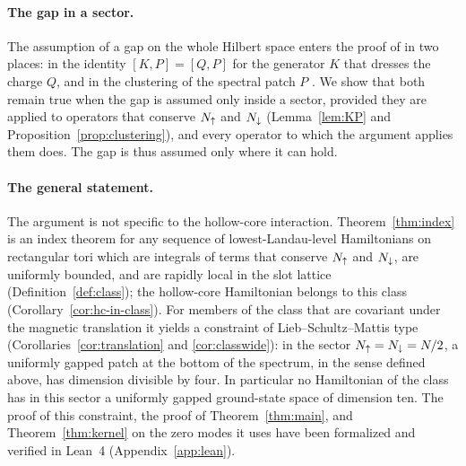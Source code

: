 \paragraph{The gap in a sector.}
The assumption of a gap on the whole Hilbert space enters the proof of \cite{BBDF21} in two places: in the
identity $[K,P]=[Q,P]$ for the generator $K$ that dresses the charge $Q$, and in the clustering of the
spectral patch $P$ \cite[Proposition~3.1]{BBDF21}. We show that both remain true when the gap is assumed
only inside a sector, provided they are applied to operators that conserve $N_{\uparrow}$ and $N_{\downarrow}$
(Lemma~\ref{lem:KP} and Proposition~\ref{prop:clustering}), and every operator to which the argument
applies them does. The gap is thus assumed only where it can hold.

\paragraph{The general statement.}
The argument is not specific to the hollow-core interaction. Theorem~\ref{thm:index} is an index theorem for
any sequence of lowest-Landau-level Hamiltonians on rectangular tori which are integrals of terms that
conserve $N_{\uparrow}$ and $N_{\downarrow}$, are uniformly bounded, and are rapidly local in the slot lattice
(Definition~\ref{def:class}); the hollow-core Hamiltonian belongs to this class
(Corollary~\ref{cor:hc-in-class}). For members of the class that are covariant under the magnetic
translation it yields a constraint of Lieb--Schultz--Mattis type (Corollaries~\ref{cor:translation} and
\ref{cor:classwide}): in the sector $N_{\uparrow}=N_{\downarrow}=N/2$, a uniformly gapped patch at the bottom of the spectrum,
in the sense defined above, has dimension divisible by four. In particular no Hamiltonian of the class has in this sector a uniformly
gapped ground-state space of dimension ten. The proof of this constraint, the proof of Theorem~\ref{thm:main}, and Theorem~\ref{thm:kernel} on the zero modes it uses have
been formalized and verified in Lean~4 (Appendix~\ref{app:lean}).

